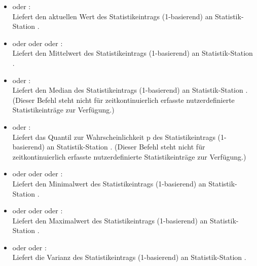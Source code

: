 \begin{itemize}

\item
{} oder :\\
Liefert den aktuellen Wert des Statistikeintrags  (1-basierend) an Statistik-Station .

\item
{} oder  oder  oder :\\
Liefert den Mittelwert des Statistikeintrags  (1-basierend) an Statistik-Station .

\item
{} oder :\\
Liefert den Median des Statistikeintrags  (1-basierend) an Statistik-Station .
(Dieser Befehl steht nicht für zeitkontinuierlich erfasste nutzerdefinierte Statistikeinträge zur Verfügung.)

\item
{} oder :\\
Liefert das Quantil zur Wahrscheinlichkeit p des Statistikeintrags  (1-basierend) an Statistik-Station .
(Dieser Befehl steht nicht für zeitkontinuierlich erfasste nutzerdefinierte Statistikeinträge zur Verfügung.)

\item
{} oder  oder  oder :\\
Liefert den Minimalwert des Statistikeintrags  (1-basierend) an Statistik-Station .

\item
{} oder  oder  oder :\\
Liefert den Maximalwert des Statistikeintrags  (1-basierend) an Statistik-Station .

\item
{} oder  oder :\\
Liefert die Varianz des Statistikeintrags  (1-basierend) an Statistik-Station .


\end{itemize}
